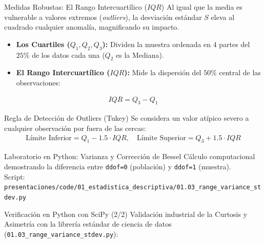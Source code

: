 \documentclass[10pt,aspectratio=169]{beamer}
\begin{document}
\begin{frame}{Medidas Robustas: El Rango Intercuartílico ($IQR$)}
  Al igual que la media es vulnerable a valores extremos (\emph{outliers}), la desviación estándar $S$ eleva al cuadrado cualquier anomalía, magnificando su impacto. \pause
  \begin{itemize}
    \item \textbf{Los Cuartiles ($Q_1, Q_2, Q_3$):} Dividen la muestra ordenada en 4 partes del $25\%$ de los datos cada una ($Q_2$ es la Mediana). \pause
    \item \textbf{El Rango Intercuartílico ($IQR$):} Mide la dispersión del $50\%$ central de las observaciones:
  \end{itemize}
  \begin{align}
    IQR = Q_3 - Q_1
  \end{align}
  \pause
  \begin{alertblock}{Regla de Detección de Outliers (Tukey)}
    Se considera un valor atípico severo a cualquier observación por fuera de las cercas:
    \begin{align}
      \text{Límite Inferior} = Q_1 - 1.5 \cdot IQR, \quad \text{Límite Superior} = Q_3 + 1.5 \cdot IQR
    \end{align}
  \end{alertblock}
\end{frame}

\begin{frame}{Laboratorio en Python: Varianza y Corrección de Bessel}
  Cálculo computacional demostrando la diferencia entre \texttt{ddof=0} (población) y \texttt{ddof=1} (muestra).
  \\ Script: \texttt{\footnotesize presentaciones/code/01\_estadistica\_descriptiva/01.03\_range\_variance\_stdev.py}
  
  \vspace{0.4em}
  {\lstset{basicstyle=\ttfamily\tiny, aboveskip=0.2em, belowskip=0.2em}
  
  }
\end{frame}

\begin{frame}[fragile]{Verificación en Python con SciPy (2/2)}
  \footnotesize
  Validación industrial de la Curtosis y Asimetría con la librería estándar de ciencia de datos (\texttt{01.03\_range\_variance\_stdev.py}):

  \vspace{0.2em}
  {\lstset{basicstyle=\ttfamily\tiny, aboveskip=0.2em, belowskip=0.2em}
  
  }
\end{frame}
\end{document}
